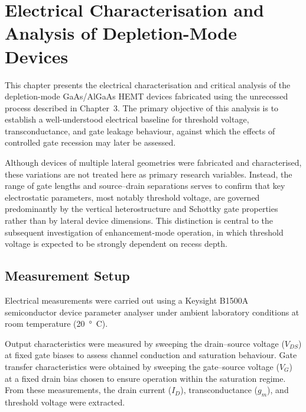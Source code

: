 \chapter{Electrical Characterisation and Analysis of Depletion-Mode Devices}

This chapter presents the electrical characterisation and critical analysis of
the depletion-mode GaAs/AlGaAs HEMT devices fabricated using the unrecessed
process described in Chapter~3. The primary objective of this analysis is to
establish a well-understood electrical baseline for threshold voltage,
transconductance, and gate leakage behaviour, against which the effects of
controlled gate recession may later be assessed.

\vspace{2mm}

Although devices of multiple lateral geometries were fabricated and
characterised, these variations are not treated here as primary research
variables. Instead, the range of gate lengths and source--drain separations
serves to confirm that key electrostatic parameters, most notably threshold
voltage, are governed predominantly by the vertical heterostructure and
Schottky gate properties rather than by lateral device dimensions. This
distinction is central to the subsequent investigation of enhancement-mode
operation, in which threshold voltage is expected to be strongly dependent on
recess depth.

\section{Measurement Setup}

Electrical measurements were carried out using a Keysight B1500A semiconductor
device parameter analyser under ambient laboratory conditions at room
temperature (\SI{20}{\degree C}). \cite{leedscleanroom_equipment}

\vspace{2mm}

Output characteristics were measured by sweeping the drain--source voltage
($V_{DS}$) at fixed gate biases to assess channel conduction and saturation
behaviour. Gate transfer characteristics were obtained by sweeping the
gate--source voltage ($V_G$) at a fixed drain bias chosen to ensure operation
within the saturation regime. From these measurements, the drain current
($I_D$), transconductance ($g_m$), and threshold voltage were extracted.

\vspace{2mm}

